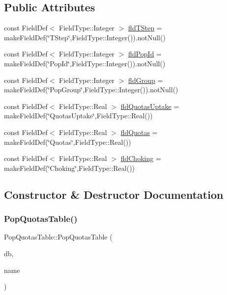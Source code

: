 \subsection*{Public Attributes}
\begin{DoxyCompactItemize}
\item 
const Field\+Def$<$ Field\+Type\+::\+Integer $>$ \mbox{\hyperlink{class_pop_quotas_table_ab62d5f68e254c679ffc29d317fbd991f}{fld\+T\+Step}} = make\+Field\+Def(\char`\"{}T\+Step\char`\"{},Field\+Type\+::\+Integer()).not\+Null()
\item 
const Field\+Def$<$ Field\+Type\+::\+Integer $>$ \mbox{\hyperlink{class_pop_quotas_table_a374b48f1c1d08d15f3a9b2be8e0f5ee1}{fld\+Pop\+Id}} = make\+Field\+Def(\char`\"{}Pop\+Id\char`\"{},Field\+Type\+::\+Integer()).not\+Null()
\item 
const Field\+Def$<$ Field\+Type\+::\+Integer $>$ \mbox{\hyperlink{class_pop_quotas_table_abde16e0cd8921f485613a30c363c55f9}{fld\+Group}} = make\+Field\+Def(\char`\"{}Pop\+Group\char`\"{},Field\+Type\+::\+Integer()).not\+Null()
\item 
const Field\+Def$<$ Field\+Type\+::\+Real $>$ \mbox{\hyperlink{class_pop_quotas_table_aef5f5346d2024b2bffa996eb723e275d}{fld\+Quotas\+Uptake}} = make\+Field\+Def(\char`\"{}Quotas\+Uptake\char`\"{},Field\+Type\+::\+Real())
\item 
const Field\+Def$<$ Field\+Type\+::\+Real $>$ \mbox{\hyperlink{class_pop_quotas_table_a6fd6c75e8c5965fd6eb23cf3ca04621e}{fld\+Quotas}} = make\+Field\+Def(\char`\"{}Quotas\char`\"{},Field\+Type\+::\+Real())
\item 
const Field\+Def$<$ Field\+Type\+::\+Real $>$ \mbox{\hyperlink{class_pop_quotas_table_aba83cb577e0868d51e4f2d6c7c12427f}{fld\+Choking}} = make\+Field\+Def(\char`\"{}Choking\char`\"{},Field\+Type\+::\+Real())
\end{DoxyCompactItemize}


\subsection{Constructor \& Destructor Documentation}
\mbox{\label{class_pop_quotas_table_a23ca08dbe563b58539bb3fba22e85c2f}} 
\subsubsection{\texorpdfstring{PopQuotasTable()}{PopQuotasTable()}}
{\footnotesize\ttfamily Pop\+Quotas\+Table\+::\+Pop\+Quotas\+Table (\begin{DoxyParamCaption}\item[{std\+::shared\+\_\+ptr$<$ sqlite\+::\+S\+Q\+Lite\+Storage $>$}]{db,  }\item[{std\+::string}]{name }\end{DoxyParamCaption})}

